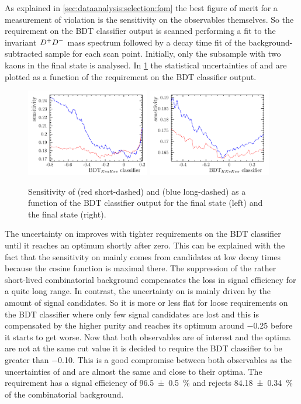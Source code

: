 As explained in \cref{sec:dataanalysis:selection:fom} the best figure of merit
for a measurement of \CP violation is the sensitivity on the \CP observables
themselves. So the requirement on the BDT classifier output is scanned
performing a fit to the invariant ${{D}^+}{{D}^-}$ mass spectrum followed by a decay
time fit of the background-subtracted sample for each scan point. Initially,
only the subsample with two kaons in the \Bd final state is analysed. In
\cref{fig:b02dd:selection:mva:sensitivities} the statistical
uncertainties of \SDD and \CDD are plotted as a function of the requirement on
the BDT classifier output.
%
\begin{figure}[!htb]
\centering
\includegraphics[width=0.48\textwidth]{07-B02DD/tikz/pdf/Sensitivities_Kpipi.pdf}
\includegraphics[width=0.48\textwidth]{07-B02DD/tikz/pdf/Sensitivities_KKpi.pdf}
\caption{Sensitivity of \SDD (red short-dashed) and \CDD (blue long-dashed) as
a function of the BDT classifier output for the \KpipiKpipi final state (left)
and the \KKpiKpipi final state (right).}
\label{fig:b02dd:selection:mva:sensitivities}
\end{figure}
%
The uncertainty on \CDD improves with tighter requirements on the BDT
classifier until it reaches an optimum shortly after zero. This can be
explained with the fact that the sensitivity on \CDD mainly comes from
candidates at low decay times because the cosine function is maximal there.
The suppression of the rather short-lived combinatorial background compensates
the loss in signal efficiency for a quite long range. In contrast, the
uncertainty on \SDD is mainly driven by the amount of signal candidates. So it
is more or less flat for loose requirements on the BDT classifier where only
few signal candidates are lost and this is compensated by the higher purity
and reaches its optimum around \num{-0.25} before it starts to get worse. Now
that both observables are of interest and the optima are not at the same cut
value it is decided to require the BDT classifier to be greater than
\num{-0.10}. This is a good compromise between both observables as the
uncertainties of \SDD and \CDD are almost the same and close to their optima.
The requirement has a signal efficiency of \SI{96.5\pm0.5}{\percent} and
rejects \SI{84.18\pm0.34}{\percent} of the combinatorial background.

